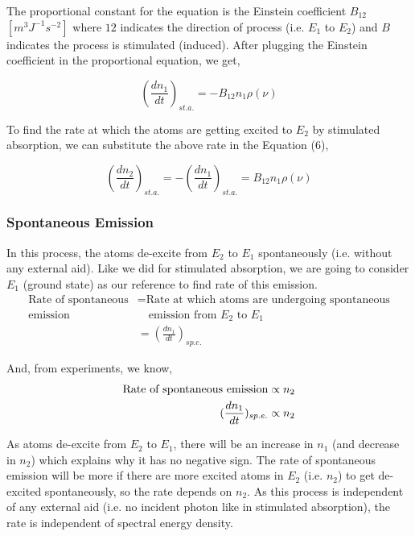 \documentclass[12pt]{article}
\begin{document}
The proportional constant for the equation is the Einstein coefficient $B_{12}$ $[m^{3}J^{-1}s^{-2}]$ where $12$ indicates the direction of process (i.e. $E_{1}$ to $E_{2}$) and $B$ indicates the process is stimulated (induced). After plugging the Einstein coefficient in the proportional equation, we get,

\begin{equation}
    (\frac{dn_{1}}{dt})_{st.a.} = -B_{12}n_{1}\rho(\nu) 
\end{equation}

To find the rate at which the atoms are getting excited to $E_{2}$ by stimulated absorption, we can substitute the above rate in the Equation (6),

\begin{equation*}
    (\frac{dn_{2}}{dt})_{st.a.} = -(\frac{dn_{1}}{dt})_{st.a.} = B_{12}n_{1}\rho(\nu)
\end{equation*}

\subsubsection{Spontaneous Emission}

In this process, the atoms de-excite from $E_{2}$ to $E_{1}$ spontaneously (i.e. without any external aid). Like we did for stimulated absorption, we are going to consider $E_{1}$ (ground state) as our reference to find rate of this emission.
\begin{align*}
    \text{Rate of spontaneous} & = \text{Rate at which atoms are undergoing spontaneous} \\
    \text{emission} & \quad \text{emission from } E_{2} \text{ to } E_{1} \\ 
    & = (\frac{dn_{1}}{dt})_{sp.e.}
\end{align*}

And, from experiments, we know, 
\begin{align*}
    \textnormal{Rate of spontaneous emission} \propto n_{2} \\ 
    (\frac{dn_{1}}{dt})_{sp.e.} \propto n_{2}
\end{align*}

As atoms de-excite from $E_{2}$ to $E_{1}$, there will be an increase in $n_{1}$ (and decrease in $n_{2}$) which explains why it has no negative sign. The rate of spontaneous emission will be more if there are more excited atoms in $E_{2}$ (i.e. $n_{2}$) to get de-excited spontaneously, so the rate depends on $n_{2}$. As this process is independent of any external aid (i.e. no incident photon like in stimulated absorption), the rate is independent of spectral energy density. \vspace{.2cm}
\end{document}
